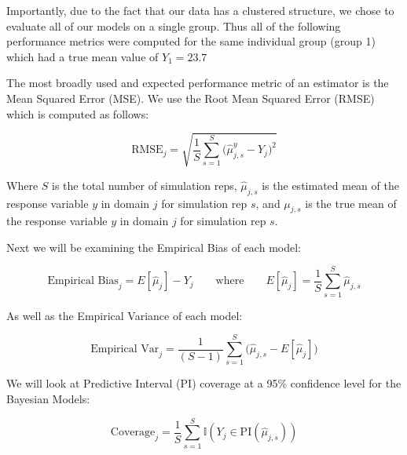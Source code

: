 \documentclass[12pt,twoside]{reedthesis}
\begin{document}
Importantly, due to the fact that our data has a clustered structure, we chose to evaluate all of our models on a single group. Thus all of the following performance metrics were computed for the same individual group (group 1) which had a true mean value of \(Y_1 = 23.7\)

The most broadly used and expected performance metric of an estimator is the Mean Squared Error (MSE). We use the Root Mean Squared Error (RMSE) which is computed as follows:

\[
\text{RMSE}_j  = \sqrt{\frac{1}{S}\sum_{s = 1}^{S}\bigg(\hat{\mu}^y_{j, s} - Y_{j}\bigg)^2}
\]

Where \(S\) is the total number of simulation reps, \(\hat{\mu}_{j, s}\) is the estimated mean of the response variable \(y\) in domain \(j\) for simulation rep \(s\), and \(\mu_{j, s}\) is the true mean of the response variable \(y\) in domain \(j\) for simulation rep \(s\).

Next we will be examining the Empirical Bias of each model:

\[
\text{Empirical Bias}_j = E[\hat{\mu}_j] - Y_{j} \qquad \text{where} \qquad E[\hat{\mu}_j] = \frac{1}{S}\sum_{s = 1}^S\hat{\mu}_{j, s}
\]

As well as the Empirical Variance of each model:

\[
\text{Empirical Var}_j  = \frac{1}{(S-1)}\sum_{s = 1}^S\Big(\hat{\mu}_{j,s} - E[\hat{\mu}_j]\Big)
\]

We will look at Predictive Interval (PI) coverage at a 95\% confidence level for the Bayesian Models:

\[
\text{Coverage}_j = \frac{1}{S}\sum_{s = 1}^S \mathbb{I}(Y_{j} \in \text{PI}(\hat{\mu}_{j, s}))
\]
\end{document}
